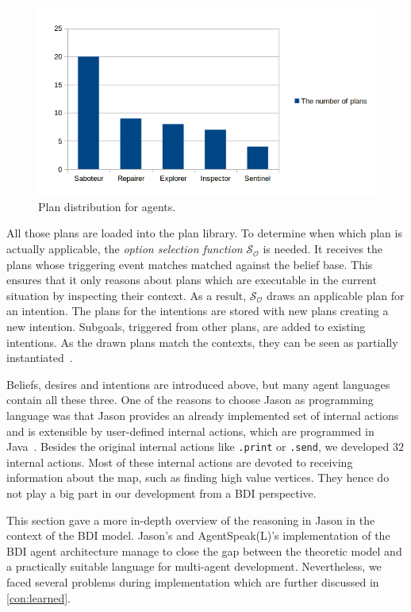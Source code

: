 \begin{figure}
  \centering
  \includegraphics[width=\textwidth]{images/BDI_plan_distribution_role}
  \caption{Plan distribution for agents.}
  \label{fig:baselinex}
\end{figure}

All those plans are loaded into the plan library.
To determine when which plan is actually applicable, the \emph{option selection function} $\mathcal{S_O}$ is needed.
It receives the plans whose triggering event matches matched against the belief base.
This ensures that it only reasons about plans which are executable in the current situation by inspecting their context.
As a result, $\mathcal{S_O}$ draws an applicable plan for an intention.
The plans for the intentions are stored with new plans creating a new intention.
Subgoals, triggered from other plans, are added to existing intentions.
As the drawn plans match the contexts, they can be seen as partially instantiated~\cite{rafel_Javabased_2007}.

Beliefs, desires and intentions are introduced above, but many agent languages contain all these three.
One of the reasons to choose Jason as programming language was that Jason provides an already implemented set of internal actions and is extensible by user-defined internal actions, which are programmed in Java~\cite{rafael_Javabased_2007}.
Besides the original internal actions like \texttt{.print} or \texttt{.send}, we developed $32$ internal actions.
Most of these internal actions are devoted to receiving information about the map, such as finding high value vertices.
They hence do not play a big part in our development from a BDI perspective.

This section gave a more in-depth overview of the reasoning in Jason in the context of the BDI model.
Jason's and AgentSpeak(L)'s implementation of the BDI agent architecture manage to close the gap between the theoretic model and a practically suitable language for multi-agent development.
Nevertheless, we faced several problems during implementation which are further discussed in \autoref{con:learned}.
